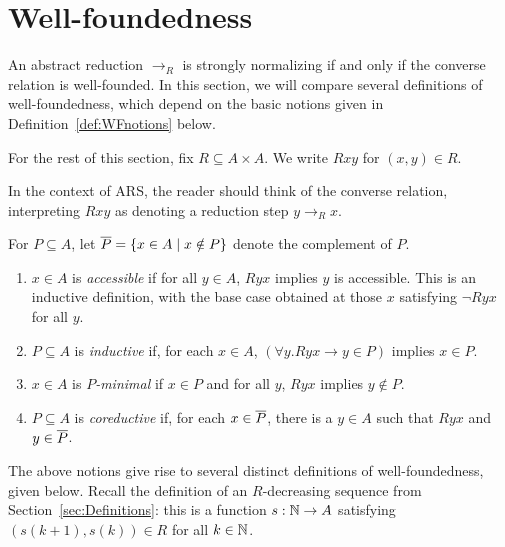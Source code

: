 \section{Well-foundedness}

\newcommand{\then}{\Longrightarrow}
\label{sec:Well-foundedness}



An abstract reduction $\to_R$ is strongly normalizing
if and only if the converse relation is well-founded.
In this section, we will compare several definitions of well-foundedness,
which depend on the basic notions given in Definition~\ref{def:WFnotions} below. 

For the rest of this section, fix $R \subseteq A \times A$.  We write $Rxy$ for $(x,y) \in R$.

In the context of ARS, the reader should think of the converse relation, 
interpreting $Rxy$ as denoting a reduction step $y \to_R x$.

For $P \subseteq A$, let $\overline{P} = \{ x \in A \mid x \notin P\}$ denote the complement of $P$.
\begin{definition}\label{def:WFnotions} \hfill 
   \begin{enumerate}
    \item $x \in A$ is \emph{accessible} if for all $y \in A$, $Ryx$ implies $y$ is accessible. 
      This is an inductive definition, with the base case obtained at 
     those $x$ satisfying $\lnot Ryx$ for all $y$.
    \item $P \subseteq A$ is \emph{inductive}
    if, for each $x \in A$, $(\forall y. Ryx \to y \in P)$ implies $x \in P$.


    \item $x \in A$ is \emph{$P$-minimal} if $x \in P$ and for all $y$,
    $Ryx$ implies $y \notin P$.

    \item $P \subseteq A$ is \emph{coreductive} if, for each $x \in \overline{P}$, there is a $y \in A$ such that $Ryx$ and $y \in \overline{P}$. 
    
  \end{enumerate}
\end{definition}

The above notions give rise to several distinct definitions of well-foundedness, given below. 
Recall the definition of an $R$-decreasing sequence from Section~\ref{sec:Definitions}:
this is a function $s : \mathbb{N} \to A$ satisfying $(s(k+1),s(k)) \in R$ for all $k \in \mathbb{N}$.

